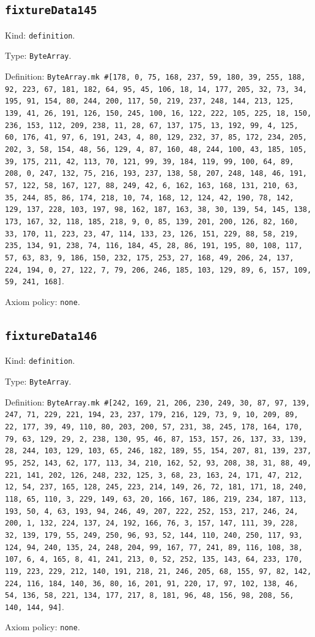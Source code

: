 \documentclass[11pt]{article}
\begin{document}
\subsection*{\texttt{fixtureData145}}
\noindent Kind: \texttt{definition}.\par
\noindent Type: \texttt{ByteArray}.\par
\noindent Definition: \texttt{ByteArray.mk \#[178, 0, 75, 168, 237, 59, 180, 39, 255, 188, 92, 223, 67, 181, 182, 64, 95, 45, 106, 18, 14, 177, 205, 32, 73, 34, 195, 91, 154, 80, 244, 200, 117, 50, 219, 237, 248, 144, 213, 125, 139, 41, 26, 191, 126, 150, 245, 100, 16, 122, 222, 105, 225, 18, 150, 236, 153, 112, 209, 238, 11, 28, 67, 137, 175, 13, 192, 99, 4, 125, 60, 176, 41, 97, 6, 191, 243, 4, 80, 129, 232, 37, 85, 172, 234, 205, 202, 3, 58, 154, 48, 56, 129, 4, 87, 160, 48, 244, 100, 43, 185, 105, 39, 175, 211, 42, 113, 70, 121, 99, 39, 184, 119, 99, 100, 64, 89, 208, 0, 247, 132, 75, 216, 193, 237, 138, 58, 207, 248, 148, 46, 191, 57, 122, 58, 167, 127, 88, 249, 42, 6, 162, 163, 168, 131, 210, 63, 35, 244, 85, 86, 174, 218, 10, 74, 168, 12, 124, 42, 190, 78, 142, 129, 137, 228, 103, 197, 98, 162, 187, 163, 38, 30, 139, 54, 145, 138, 173, 167, 32, 118, 185, 218, 9, 0, 85, 139, 201, 200, 126, 82, 160, 33, 170, 11, 223, 23, 47, 114, 133, 23, 126, 151, 229, 88, 58, 219, 235, 134, 91, 238, 74, 116, 184, 45, 28, 86, 191, 195, 80, 108, 117, 57, 63, 83, 9, 186, 150, 232, 175, 253, 27, 168, 49, 206, 24, 137, 224, 194, 0, 27, 122, 7, 79, 206, 246, 185, 103, 129, 89, 6, 157, 109, 59, 241, 168]}.\par
\noindent Axiom policy: \texttt{none}.\par
\subsection*{\texttt{fixtureData146}}
\noindent Kind: \texttt{definition}.\par
\noindent Type: \texttt{ByteArray}.\par
\noindent Definition: \texttt{ByteArray.mk \#[242, 169, 21, 206, 230, 249, 30, 87, 97, 139, 247, 71, 229, 221, 194, 23, 237, 179, 216, 129, 73, 9, 10, 209, 89, 22, 177, 39, 49, 110, 80, 203, 200, 57, 231, 38, 245, 178, 164, 170, 79, 63, 129, 29, 2, 238, 130, 95, 46, 87, 153, 157, 26, 137, 33, 139, 28, 244, 103, 129, 103, 65, 246, 182, 189, 55, 154, 207, 81, 139, 237, 95, 252, 143, 62, 177, 113, 34, 210, 162, 52, 93, 208, 38, 31, 88, 49, 221, 141, 202, 126, 248, 232, 125, 3, 68, 23, 163, 24, 171, 47, 212, 12, 54, 237, 165, 128, 245, 223, 214, 149, 26, 72, 181, 171, 18, 240, 118, 65, 110, 3, 229, 149, 63, 20, 166, 167, 186, 219, 234, 187, 113, 193, 50, 4, 63, 193, 94, 246, 49, 207, 222, 252, 153, 217, 246, 24, 200, 1, 132, 224, 137, 24, 192, 166, 76, 3, 157, 147, 111, 39, 228, 32, 139, 179, 55, 249, 250, 96, 93, 52, 144, 110, 240, 250, 117, 93, 124, 94, 240, 135, 24, 248, 204, 99, 167, 77, 241, 89, 116, 108, 38, 107, 6, 4, 165, 8, 41, 241, 213, 0, 52, 252, 135, 143, 64, 233, 170, 119, 223, 229, 212, 140, 191, 218, 21, 246, 205, 68, 155, 97, 82, 142, 224, 116, 184, 140, 36, 80, 16, 201, 91, 220, 17, 97, 102, 138, 46, 54, 136, 58, 221, 134, 177, 217, 8, 181, 96, 48, 156, 98, 208, 56, 140, 144, 94]}.\par
\noindent Axiom policy: \texttt{none}.\par
\end{document}
